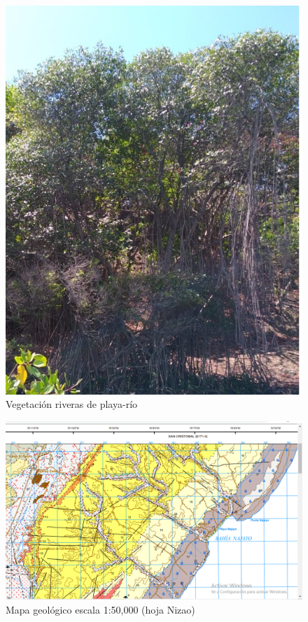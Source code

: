 \documentclass[11pt,]{article}
\begin{document}
\begin{figure}
\centering
\includegraphics{mangle_rojo.png}
\caption{Vegetación riveras de playa-río\label{manglerojo}}
\end{figure}

\begin{figure}
\centering
\includegraphics{mapa_bahia_najayo.png}
\caption{Mapa geológico escala 1:50,000 (hoja Nizao)\label{mapageo50k}}
\end{figure}
\end{document}

